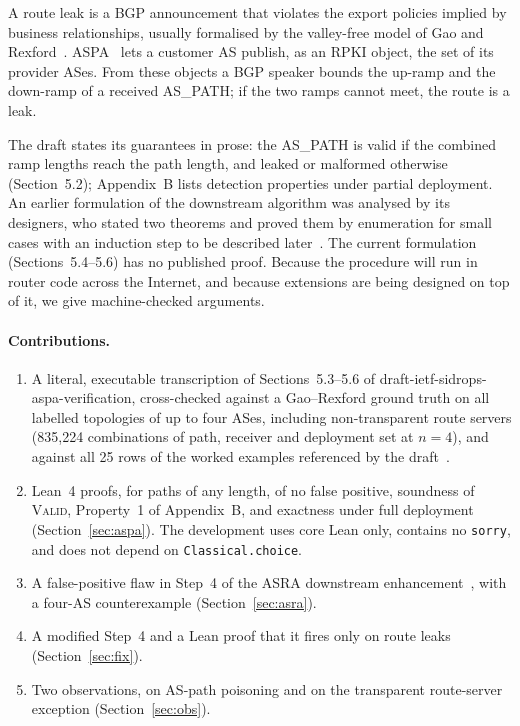 \documentclass[11pt,a4paper]{article}
\theoremstyle{definition}
\theoremstyle{remark}
\newcommand{\Valid}{\textup{\textsc{Valid}}}
\newcommand{\lean}[1]{\texttt{#1}}
\begin{document}
A route leak is a BGP announcement that violates the export policies implied by business
relationships, usually formalised by the valley-free model of Gao and Rexford~\cite{gao-rexford,rfc7908}.
ASPA~\cite{aspa-profile,aspa-verification} lets a customer AS publish, as an RPKI object, the set of its
provider ASes. From these objects a BGP speaker bounds the up-ramp and the down-ramp of a received
AS\_PATH; if the two ramps cannot meet, the route is a leak.

The draft states its guarantees in prose: the AS\_PATH is valid if the combined ramp lengths reach the
path length, and leaked or malformed otherwise (Section~5.2); Appendix~B lists detection properties
under partial deployment. An earlier formulation of the downstream algorithm was analysed by its
designers, who stated two theorems and proved them by enumeration for small cases with an induction
step to be described later~\cite{sriram-heitz}. The current formulation (Sections~5.4--5.6) has no
published proof. Because the procedure will run in router code across the Internet, and because
extensions are being designed on top of it, we give machine-checked arguments.

\paragraph{Contributions.}
\begin{enumerate}[nosep]
  \item A literal, executable transcription of Sections~5.3--5.6 of draft-ietf-sidrops-aspa-verification,
        cross-checked against a Gao--Rexford ground truth on all labelled topologies of up to four ASes,
        including non-transparent route servers (835{,}224 combinations of path, receiver and deployment
        set at $n=4$), and against all 25 rows of the worked examples referenced by the draft~\cite{aspa-examples}.
  \item Lean~4 proofs, for paths of any length, of no false positive, soundness of \Valid, Property~1 of
        Appendix~B, and exactness under full deployment (Section~\ref{sec:aspa}). The development uses core
        Lean only, contains no \lean{sorry}, and does not depend on \lean{Classical.choice}.
  \item A false-positive flaw in Step~4 of the ASRA downstream enhancement~\cite{asra}, with a four-AS
        counterexample (Section~\ref{sec:asra}).
  \item A modified Step~4 and a Lean proof that it fires only on route leaks (Section~\ref{sec:fix}).
  \item Two observations, on AS-path poisoning and on the transparent route-server exception
        (Section~\ref{sec:obs}).
\end{enumerate}
\end{document}
